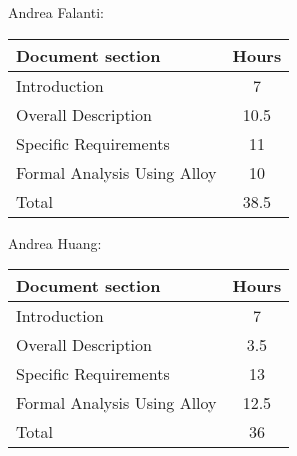 Andrea Falanti:

\begin{tabular}{|l|c|}
    \hline
    Document section & Hours \\
    \hline
     Introduction & 7\\
     Overall Description & 10.5\\
     Specific Requirements & 11\\
     Formal Analysis Using Alloy & 10\\
     \hline
     Total & 38.5\\
     \hline
\end{tabular}
\vskip 0.3in

Andrea Huang:

\begin{tabular}{|l|c|}
    \hline
    Document section & Hours \\
    \hline
     Introduction &  7\\
     Overall Description & 3.5\\
     Specific Requirements & 13\\
     Formal Analysis Using Alloy & 12.5\\
     \hline
     Total & 36\\
     \hline
\end{tabular}